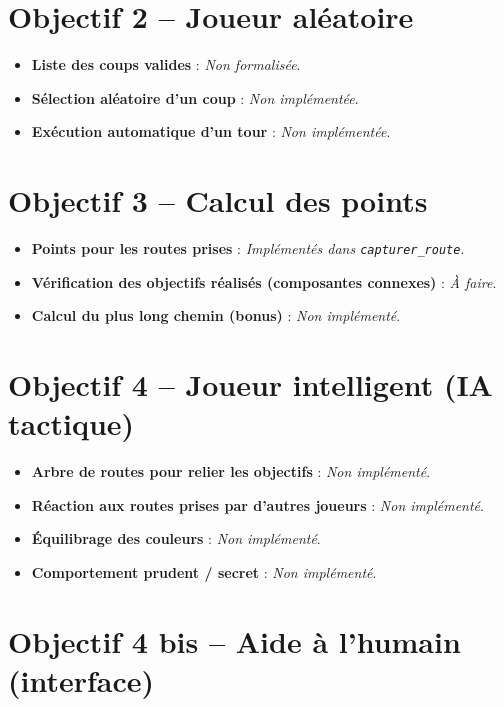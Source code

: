 \documentclass[a4paper,12pt]{report}
\begin{document}
\section*{Objectif 2 – Joueur aléatoire}

\begin{itemize}
    \item \textbf{Liste des coups valides} : \textit{Non formalisée}.
    \item \textbf{Sélection aléatoire d’un coup} : \textit{Non implémentée}.
    \item \textbf{Exécution automatique d’un tour} : \textit{Non implémentée}.
\end{itemize}

\section*{Objectif 3 – Calcul des points}

\begin{itemize}
    \item \textbf{Points pour les routes prises} : \textit{Implémentés dans \texttt{capturer\_route}}.
    \item \textbf{Vérification des objectifs réalisés (composantes connexes)} : \textit{À faire}.
    \item \textbf{Calcul du plus long chemin (bonus)} : \textit{Non implémenté}.
\end{itemize}

\section*{Objectif 4 – Joueur intelligent (IA tactique)}

\begin{itemize}
    \item \textbf{Arbre de routes pour relier les objectifs} : \textit{Non implémenté}.
    \item \textbf{Réaction aux routes prises par d'autres joueurs} : \textit{Non implémenté}.
    \item \textbf{Équilibrage des couleurs} : \textit{Non implémenté}.
    \item \textbf{Comportement prudent / secret} : \textit{Non implémenté}.
\end{itemize}

\section*{Objectif 4 bis – Aide à l'humain (interface)}
\end{document}
